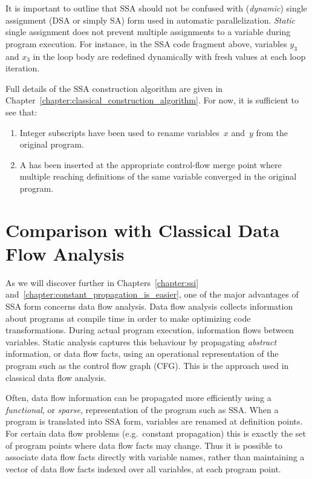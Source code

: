 It is important to outline that SSA should not be confused with (\emph{dynamic}) single assignment (DSA or simply SA) form used in automatic parallelization. \emph{Static} single assignment does not prevent multiple assignments to a variable
during program execution. For instance, in the SSA code fragment above,
variables $y_3$ and $x_3$ in the loop body are 
redefined dynamically with fresh values 
at each loop iteration. 

Full details of the SSA construction algorithm are given in 
Chapter~\ref{chapter:classical_construction_algorithm}. For now, it is sufficient to see that:
\begin{enumerate}
\item Integer subscripts have been used to rename
variables~$x$ and~$y$ from the original program.
\item A \phifun has been
inserted at the appropriate control-flow merge point where multiple reaching
definitions of the same variable converged in the original program.
\end{enumerate}



\section{Comparison with Classical Data Flow Analysis}
\label{sec:vanilla:dfa}
As we will discover further in Chapters~\ref{chapter:ssi} and~\ref{chapter:constant_propagation_is_easier}, one of the major advantages of SSA form concerns data flow analysis.
Data flow analysis collects information about programs
at compile time
in order to make optimizing code transformations.
During actual program execution, information flows between
variables. Static analysis captures
this behaviour by propagating \textit{abstract} information,
or data flow facts,
using an operational representation of the 
program such as the control flow graph (CFG).
This is the approach used in 
classical data flow analysis.

Often, data flow information can be propagated more efficiently
using a \textit{functional}, or \textit{sparse},
representation of the program such 
as SSA.
When a program is translated into SSA form,
variables are renamed at definition points.
For certain data flow problems (e.g.~constant propagation)
this is exactly the set of program points where data flow
facts may change.
Thus it is possible to associate data flow facts directly with 
variable names, rather than
maintaining a vector of data flow facts indexed over all variables,
at each program point.

